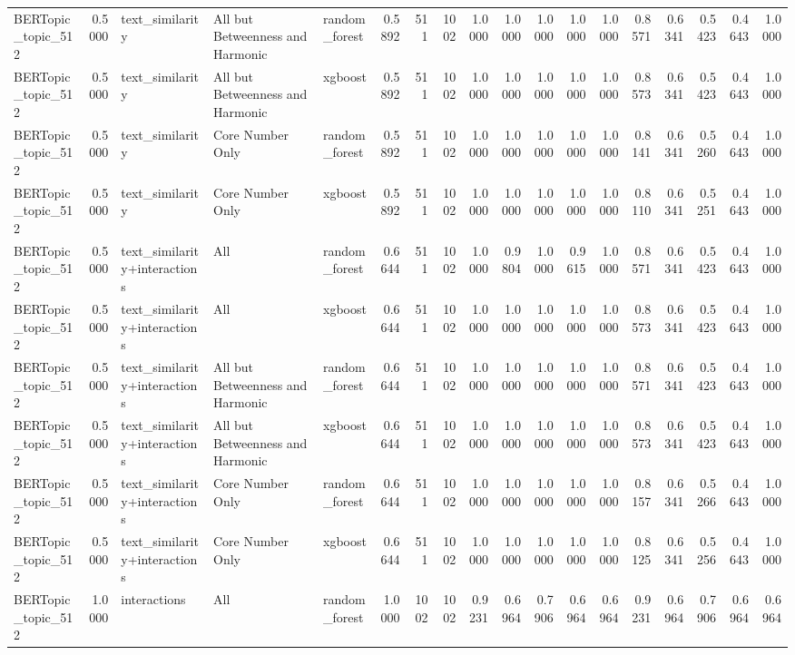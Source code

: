 \begin{tabular}{lrlllrrrrrrrrrrrrr}
BERTopic_topic_512 & 0.5000 & text_similarity & All but Betweenness and Harmonic & random_forest & 0.5892 & 511 & 1002 & 1.0000 & 1.0000 & 1.0000 & 1.0000 & 1.0000 & 0.8571 & 0.6341 & 0.5423 & 0.4643 & 1.0000 \\
BERTopic_topic_512 & 0.5000 & text_similarity & All but Betweenness and Harmonic & xgboost & 0.5892 & 511 & 1002 & 1.0000 & 1.0000 & 1.0000 & 1.0000 & 1.0000 & 0.8573 & 0.6341 & 0.5423 & 0.4643 & 1.0000 \\
BERTopic_topic_512 & 0.5000 & text_similarity & Core Number Only & random_forest & 0.5892 & 511 & 1002 & 1.0000 & 1.0000 & 1.0000 & 1.0000 & 1.0000 & 0.8141 & 0.6341 & 0.5260 & 0.4643 & 1.0000 \\
BERTopic_topic_512 & 0.5000 & text_similarity & Core Number Only & xgboost & 0.5892 & 511 & 1002 & 1.0000 & 1.0000 & 1.0000 & 1.0000 & 1.0000 & 0.8110 & 0.6341 & 0.5251 & 0.4643 & 1.0000 \\
BERTopic_topic_512 & 0.5000 & text_similarity+interactions & All & random_forest & 0.6644 & 511 & 1002 & 1.0000 & 0.9804 & 1.0000 & 0.9615 & 1.0000 & 0.8571 & 0.6341 & 0.5423 & 0.4643 & 1.0000 \\
BERTopic_topic_512 & 0.5000 & text_similarity+interactions & All & xgboost & 0.6644 & 511 & 1002 & 1.0000 & 1.0000 & 1.0000 & 1.0000 & 1.0000 & 0.8573 & 0.6341 & 0.5423 & 0.4643 & 1.0000 \\
BERTopic_topic_512 & 0.5000 & text_similarity+interactions & All but Betweenness and Harmonic & random_forest & 0.6644 & 511 & 1002 & 1.0000 & 1.0000 & 1.0000 & 1.0000 & 1.0000 & 0.8571 & 0.6341 & 0.5423 & 0.4643 & 1.0000 \\
BERTopic_topic_512 & 0.5000 & text_similarity+interactions & All but Betweenness and Harmonic & xgboost & 0.6644 & 511 & 1002 & 1.0000 & 1.0000 & 1.0000 & 1.0000 & 1.0000 & 0.8573 & 0.6341 & 0.5423 & 0.4643 & 1.0000 \\
BERTopic_topic_512 & 0.5000 & text_similarity+interactions & Core Number Only & random_forest & 0.6644 & 511 & 1002 & 1.0000 & 1.0000 & 1.0000 & 1.0000 & 1.0000 & 0.8157 & 0.6341 & 0.5266 & 0.4643 & 1.0000 \\
BERTopic_topic_512 & 0.5000 & text_similarity+interactions & Core Number Only & xgboost & 0.6644 & 511 & 1002 & 1.0000 & 1.0000 & 1.0000 & 1.0000 & 1.0000 & 0.8125 & 0.6341 & 0.5256 & 0.4643 & 1.0000 \\
BERTopic_topic_512 & 1.0000 & interactions & All & random_forest & 1.0000 & 1002 & 1002 & 0.9231 & 0.6964 & 0.7906 & 0.6964 & 0.6964 & 0.9231 & 0.6964 & 0.7906 & 0.6964 & 0.6964 \\

\end{tabular}
